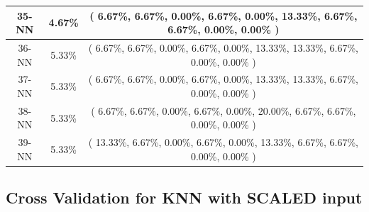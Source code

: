 \documentclass[11pt,a4paper]{article}
\begin{document}
\begin{center}
\begin{tabular} {|| c | c | c ||}
35-NN & 4.67\% & ( 6.67\%, 6.67\%, 0.00\%, 6.67\%, 0.00\%, 13.33\%, 6.67\%, 6.67\%, 0.00\%, 0.00\% )\\ \hline
36-NN & 5.33\% & ( 6.67\%, 6.67\%, 0.00\%, 6.67\%, 0.00\%, 13.33\%, 13.33\%, 6.67\%, 0.00\%, 0.00\% )\\ \hline
37-NN & 5.33\% & ( 6.67\%, 6.67\%, 0.00\%, 6.67\%, 0.00\%, 13.33\%, 13.33\%, 6.67\%, 0.00\%, 0.00\% )\\ \hline
38-NN & 5.33\% & ( 6.67\%, 6.67\%, 0.00\%, 6.67\%, 0.00\%, 20.00\%, 6.67\%, 6.67\%, 0.00\%, 0.00\% )\\ \hline
39-NN & 5.33\% & ( 13.33\%, 6.67\%, 0.00\%, 6.67\%, 0.00\%, 13.33\%, 6.67\%, 6.67\%, 0.00\%, 0.00\% )\\ \hline
    \end{tabular}
\end{center}
\newpage

\subsection{Cross Validation for KNN with SCALED input}
\hypertarget{twoFoldResultNorm}{}
\end{document}
